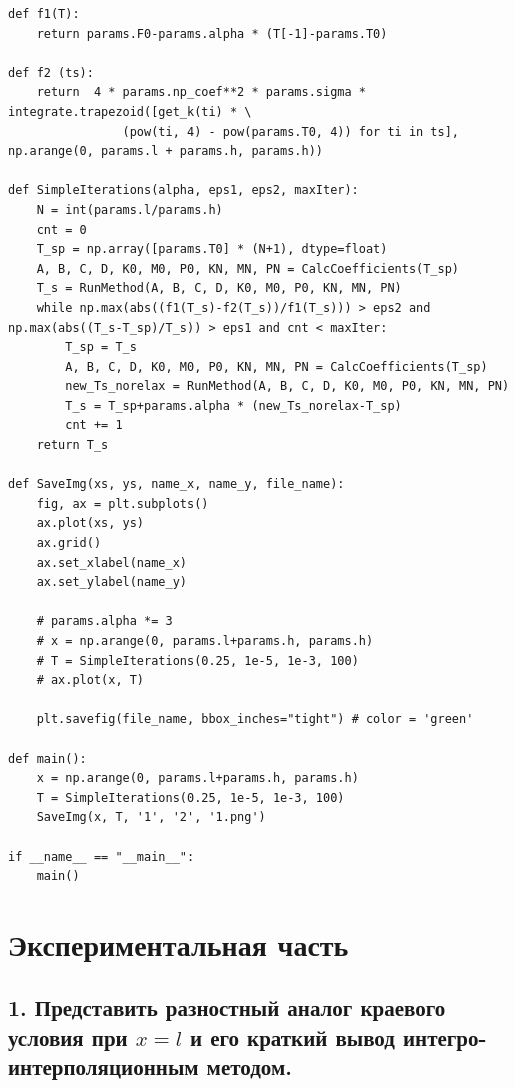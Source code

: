 \documentclass[a4paper,oneside,12pt]{extreport}
\begin{document}
\begin{lstlisting}[]
def f1(T):
	return params.F0-params.alpha * (T[-1]-params.T0)

def f2 (ts):
	return  4 * params.np_coef**2 * params.sigma * integrate.trapezoid([get_k(ti) * \
				(pow(ti, 4) - pow(params.T0, 4)) for ti in ts], np.arange(0, params.l + params.h, params.h))

def SimpleIterations(alpha, eps1, eps2, maxIter):
	N = int(params.l/params.h)
	cnt = 0 
	T_sp = np.array([params.T0] * (N+1), dtype=float)
	A, B, C, D, K0, M0, P0, KN, MN, PN = CalcCoefficients(T_sp)
	T_s = RunMethod(A, B, C, D, K0, M0, P0, KN, MN, PN)
	while np.max(abs((f1(T_s)-f2(T_s))/f1(T_s))) > eps2 and np.max(abs((T_s-T_sp)/T_s)) > eps1 and cnt < maxIter:
		T_sp = T_s
		A, B, C, D, K0, M0, P0, KN, MN, PN = CalcCoefficients(T_sp)
		new_Ts_norelax = RunMethod(A, B, C, D, K0, M0, P0, KN, MN, PN)
		T_s = T_sp+params.alpha * (new_Ts_norelax-T_sp)
		cnt += 1
	return T_s

def SaveImg(xs, ys, name_x, name_y, file_name):
	fig, ax = plt.subplots()
	ax.plot(xs, ys)
	ax.grid()
	ax.set_xlabel(name_x)
	ax.set_ylabel(name_y)

	# params.alpha *= 3
	# x = np.arange(0, params.l+params.h, params.h)
	# T = SimpleIterations(0.25, 1e-5, 1e-3, 100)
	# ax.plot(x, T)

	plt.savefig(file_name, bbox_inches="tight") # color = 'green'

def main():
	x = np.arange(0, params.l+params.h, params.h)
	T = SimpleIterations(0.25, 1e-5, 1e-3, 100)
	SaveImg(x, T, '1', '2', '1.png')

if __name__ == "__main__":
	main()
\end{lstlisting}

\newpage 

\section{Экспериментальная часть}

\subsection{1. Представить разностный аналог краевого условия при $x = l$ и его краткий вывод интегро-интерполяционным методом.}
\end{document}
